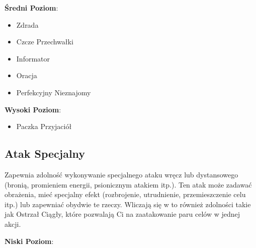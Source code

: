 \textbf{Średni Poziom}:

\begin{itemize}
\item Zdrada
\item Czcze Przechwałki
\item Informator
\item Oracja
\item Perfekcyjny Nieznajomy
\end{itemize}

\textbf{Wysoki Poziom}:

\begin{itemize}
\item Paczka Przyjaciół
\end{itemize}

\subsection{Atak Specjalny}

Zapewnia zdolność wykonywanie specjalnego ataku wręcz lub dystansowego (bronią, promieniem energii, psionicznym atakiem itp.). Ten atak może zadawać obrażenia, mieć specjalny efekt (rozbrojenie, utrudnienie, przemieszczenie celu itp.) lub zapewniać obydwie te rzeczy. Wliczają się w to również zdolności takie jak Ostrzał Ciągły, które pozwalają Ci na zaatakowanie paru celów w jednej akcji.

\textbf{Niski Poziom}:

